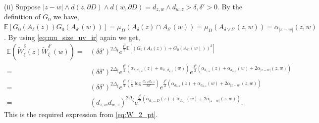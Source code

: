 \documentclass[a4paper, 11pt, reqno]{amsart}
\theoremstyle{definition} \newtheorem{defn}{Definition}[section]
\theoremstyle{remark} \newtheorem{rem}[defn]{Remark}
\theoremstyle{remark} \newtheorem*{rem*}{Remark}
\theoremstyle{plain} \newtheorem{thm}[defn]{Theorem}
\theoremstyle{plain} \newtheorem{lem}[defn]{Lemma}
\theoremstyle{plain} \newtheorem{prop}[defn]{Proposition}
\theoremstyle{plain} \newtheorem{cor}[defn]{Corollary}
\theoremstyle{remark} \newtheorem{exm}[defn]{\textbf{Example}}
\theoremstyle{remark} \newtheorem{exms}[defn]{\textbf{Examples}}
\theoremstyle{remark} \newtheorem*{bl}{}
\numberwithin{equation}{section} %
\newcommand{\E}{\mathbb{E}}
\begin{document}
        (ii) Suppose $|z-w|\wedge d(z, \partial D) \wedge d(w, \partial D) = d_{z,w}\wedge d_{w,z}>\delta, \delta'>0$. By the definition of  $G_0$ we have, $\E[G_0(A_{\delta}(z)) G_0( A_{\delta'}(w))] = \mu_D(A_{\delta}(z) \cap A_{\delta'}(w) ) = \mu_D(A_{\delta\vee \delta'}(z,w)) = \alpha_{|z-w|} (z,w)$. By using \eqref{eq:mu_size_uv_ir} again we get,
		\begin{align}\label{eq:W_conv_3}
			\E (\tilde{W}^{\delta}_{\xi}(z) \tilde{W}^{\delta'}_{\xi}(w))
			= & (\delta\delta')^{2\Delta_{\xi}} e^{ \frac{\xi^2}{2} \E[(G_0(A_{\delta}(z)) + G_0(A_{\delta'}(w)))^2] }
			\nonumber \\
			= & (\delta\delta')^{2\Delta_{\xi}} e^{\frac{\xi^2}{2} \left( \alpha_{\delta , d_{z,w}} (z) + \alpha_{\delta', d_{w,z}}(w)\right)} e^{\frac{\xi^2}{2} \left( \alpha_{d_{z,w}}(z) + \alpha_{d_{w,z}}(w)+ 2 \alpha_{|z-w|}(z,w) \right) }
			\nonumber \\
			= & (\delta\delta')^{2\Delta_{\xi}} e^{\frac{\xi^2}{2} \left( \frac{1}{5}\log \frac{d_{z,w}d_{w,z}}{\delta \delta'}\right)} 
                e^{ \frac{\xi^2}{2} \left( \alpha_{d_{z,w}}(z) + \alpha_{d_{w,z}}(w)+ 2 \alpha_{|z-w|}(z,w) \right)}
			\nonumber \\
			= & (d_{z,w}d_{w,z})^{2\Delta_{\xi}} e^{\frac{\xi^2}{2}  \left( \alpha_{d_{z,w},D}(z) + \alpha_{d_{w,z}}(w)+ 2 \alpha_{|z-w|}(z,w) \right) }.
		\end{align}		
		This is the required expression from \eqref{eq:W_2_pt}.	
		
\end{document}
